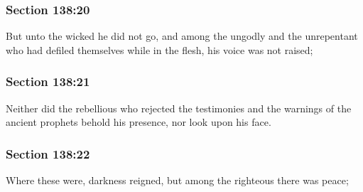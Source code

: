 	\subsubsection{Section 138:20} %
		\label{DC138-20}

		But unto the wicked he did not go, and among the ungodly and the unrepentant who had defiled themselves while in the flesh, his voice was not raised;


	\subsubsection{Section 138:21} %
		\label{DC138-21}

		Neither did the rebellious who rejected the testimonies and the warnings of the ancient prophets behold his presence, nor look upon his face.


	\subsubsection{Section 138:22} %
		\label{DC138-22}

		Where these were, darkness reigned, but among the righteous there was peace;


